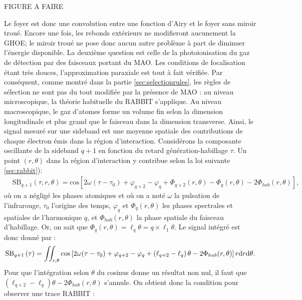 \textcolor[rgb]{1,0,0}{FIGURE A FAIRE}

Le foyer est donc une convolution entre une fonction d'Airy et le foyer sans miroir troué. Encore une fois, les rebonds extérieurs ne modifieront aucunement la GHOE; le miroir troué ne pose donc aucun autre problème à part de diminuer l'énergie disponible.
La deuxième question est celle de la photoionisation du gaz de détection par des faisceaux portant du MAO. Les conditions de focalisation étant très douces, l'approximation paraxiale est tout à fait vérifiée. Par conséquent, comme montré dans la partie \ref{sec:selectionrules}, les règles de sélection ne sont pas du tout modifiée par la présence de MAO : au niveau microscopique, la théorie habituelle du RABBIT s'applique. Au niveau macroscopique, le gaz d'atomes forme un volume fin selon la dimension longitudinale et plus grand que le faisceau dans la dimension transverse. Ainsi, le signal mesuré sur une sideband est une moyenne spatiale des contributions de chaque électron émis dans la région d'interaction. Considérons la composante oscillante de la sideband $q+1$ en fonction du retard génération-habillage $\tau$. Un point $(r,\theta)$ dans la région d'interaction y contribue selon la loi suivante \ref{sec:rabbit}):
\begin{align*}
  & \text{S}{{\text{B}}_{q+1}}\left( \tau ,r,\theta  \right)=\text{cos}\left[ 2\omega {\left(\tau-{\tau }_{0}\right)}+{{\varphi }_{q+2}}-{{\varphi }_{q}}+{{\Phi }_{q+2}}\left( r,\theta  \right)-{{\Phi }_{q}}\left( r,\theta  \right)-2{{\Phi }_{hab}}(r,\theta ) \right],
\end{align*}
où on a négligé les phases atomiques et où on a noté $\omega$ la pulsation de l'infrarouge, $\tau_0$ l'origine des temps, $\varphi_q$ et $\Phi_q(r,\theta)$ les phases spectrales et spatiales de l'harmonique $q$, et ${\Phi }_{hab}(r,\theta)$ la phase spatiale du faisceau d'habillage. Or, on sait que $\Phi_q(r,\theta)=\ell_q\theta = q\times\ell_1\theta$. Le signal intégré est donc donné par :
\begin{equation*}
\text{S}{{\text{B}}_{q+1}}\left(\tau\right)=\iint_{r,\theta}{\text{cos}\left[ 2\omega {\left(\tau-{\tau }_{0}\right)}+{{\varphi }_{q+2}}-{{\varphi }_{q}}+\left(\ell_{q+2}-\ell_q\right)\theta-2{{\Phi }_{hab}}(r,\theta ) \right]r\mathrm{d} r \mathrm{d} \theta}.
\end{equation*}
Pour que l'intégration selon $\theta$ du cosinus donne un résultat non nul, il faut que $\left(\ell_{q+2}-\ell_q\right)\theta-2{{\Phi }_{hab}}(r,\theta )$ s'annule. On obtient donc la condition pour observer une trace RABBIT : 
